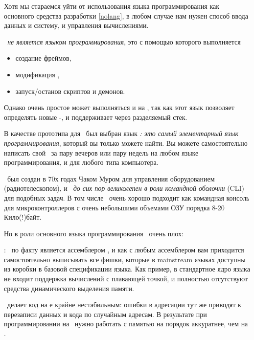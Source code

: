 \clearpage
{}\secdown

Хотя мы стараемся уйти от использования языка программирования как основного
средства разработки \ref{nolang}, в любом случае нам нужен способ ввода данных и
систему, и управления вычислениями.

\emph{\metal\ не является языком
программирования}, это  с помощью которого выполняется
\begin{itemize}[nosep]
  \item 
создание фреймов, 
  \item 
модификация , 
  \item 
запуск/останов скриптов и демонов. 
\end{itemize}
Однако очень простое  может выполняться и на \metal, так как этот язык позволяет
определять новые \F-, и поддерживает  через разделяемый стек.

\clearpage
В качестве прототипа для \metal\ был выбран язык \emph{\F: это самый
элементарный язык программирования}, который вы только можете найти. Вы можете
самостоятельно написать свой \F\ за пару вечеров или пару недель на любом языке
программирования, и для любого типа компьютера.

\F\ был создан в 70х годах Чаком Муром для управления оборудованием
(радиотелескопом), и \emph{\F\ до сих пор великолепен в роли командной оболочки}
(CLI) для подобных задач. В том числе \F\ очень хорошо подходит как командная
консоль для микроконтроллеров с очень небольшими объемами ОЗУ порядка 8-20
Кило(!)байт.

Но в роли основного языка программирования \F\ очень плох:
\begin{description}[nosep]
\item[низкоуровневая модель ВМ языка]: \F\ по факту является ассемблером
, и как с любым ассемблером вам приходится
самостоятельно выписывать все фишки, которые в mainstream языках доступны из
коробки в базовой спецификации языка. Как пример, в стандартное ядро языка не
входит поддержка вычислений с плавающей точкой, и полностью отсутствуют средства
динамического выделения памяти.
\item[прямой доступ к памяти по адресам]\ делает код на \F е крайне
нестабильным: ошибки в адресации тут же приводят к перезаписи данных и кода по
случайным адресам. В результате при программировании на \F\ нужно работать с
памятью на порядок аккуратнее, чем на \emc.
\end{description}

\secup
